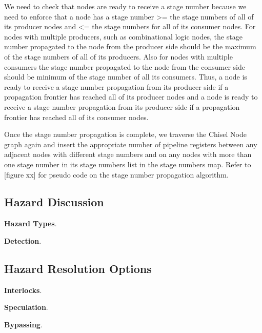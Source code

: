 We need to check that nodes are ready to receive a stage number because we need to enforce that a node has a stage number >= the stage numbers of all of its producer nodes and <= the stage numbers for all of its consumer nodes. For nodes with multiple producers, such as combinational logic nodes, the stage number propagated to the node from the producer side should be the maximum of the stage numbers of all of its producers. Also for nodes with multiple consumers the stage number propagated to the node from the consumer side should be minimum of the stage number of all its consumers. Thus, a node is ready to receive a stage number propagation from its producer side if a propagation frontier has reached all of its producer nodes and a node is ready to receive a stage number propagation from its producer side if a propagation frontier has reached all of its consumer nodes.

Once the stage number propagation is complete, we traverse the Chisel Node graph again and insert the appropriate number of pipeline registers between any adjacent nodes with different stage numbers and on any nodes with more than one stage number in its stage numbers list in the stage numbers map. Refer to [figure xx] for pseudo code on the stage number propagation algorithm.
\subsection{Hazard Discussion}

{\bf Hazard Types}.

{\bf Detection}.

\subsection{Hazard Resolution Options}

{\bf Interlocks}.

{\bf Speculation}.

{\bf Bypassing}.
